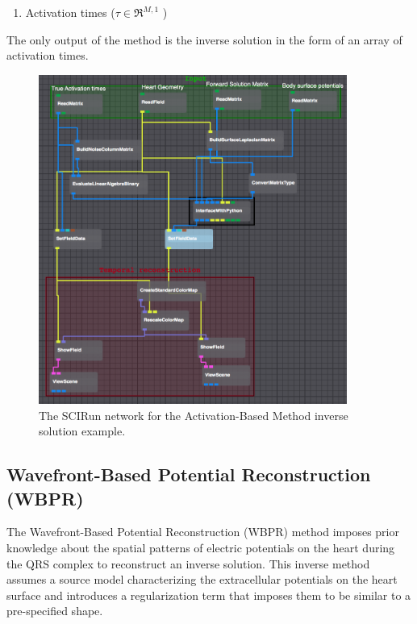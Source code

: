     \begin{enumerate}
        \item Activation times ($\tau\in\Re^{M,1}$ )
    \end{enumerate}
    The only output of the method is the inverse solution in the form of an array of activation times.
    
   \begin{figure}
       \begin{center}
       \includegraphics[width=0.9\textwidth]{ECGToolkitGuide_figures/activationBasedNetwork.png}
       \caption{The SCIRun network for the Activation-Based Method inverse solution example.}
       \label{fig:activationBasedNetwork}
       \end{center}
   \end{figure}


\subsection{Wavefront-Based Potential Reconstruction (WBPR)}

    The Wavefront-Based Potential Reconstruction (WBPR) method imposes prior knowledge about the spatial patterns of electric potentials on the heart during the QRS complex to reconstruct an inverse solution. 
    This inverse method assumes a source model characterizing the extracellular potentials on the heart surface and introduces a regularization term that imposes them to be similar to a pre-specified shape.
    
